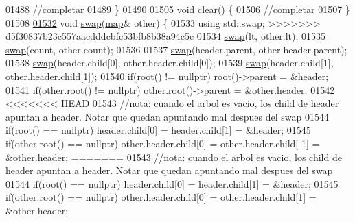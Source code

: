 \begin{DoxyCode}
01488         \textcolor{comment}{//completar}
01489     \}
01490 
\hyperlink{namespaceaed2_ac055546b287d4b50772e8b4e9d188ed2_ac055546b287d4b50772e8b4e9d188ed2}{01505}     \textcolor{keywordtype}{void} \hyperlink{namespaceaed2_ac055546b287d4b50772e8b4e9d188ed2_ac055546b287d4b50772e8b4e9d188ed2}{clear}() \{
01506         \textcolor{comment}{//completar}
01507     \}
01508 
\hyperlink{namespaceaed2_ab24ac4be44835194ce27a61969e4a292_ab24ac4be44835194ce27a61969e4a292}{01532}     \textcolor{keywordtype}{void} \hyperlink{namespaceaed2_ab24ac4be44835194ce27a61969e4a292_ab24ac4be44835194ce27a61969e4a292}{swap}(\hyperlink{classaed2_1_1map}{map}& other) \{
01533         \textcolor{keyword}{using} std::swap;
>>>>>>> d5f30837b23c557aacdddcbfc53bfb8b38a94c5c
01534         \hyperlink{namespaceaed2_ab24ac4be44835194ce27a61969e4a292_ab24ac4be44835194ce27a61969e4a292}{swap}(lt, other.lt);
01535         \hyperlink{namespaceaed2_ab24ac4be44835194ce27a61969e4a292_ab24ac4be44835194ce27a61969e4a292}{swap}(count, other.count);
01536 
01537         \hyperlink{namespaceaed2_ab24ac4be44835194ce27a61969e4a292_ab24ac4be44835194ce27a61969e4a292}{swap}(header.parent, other.header.parent);
01538         \hyperlink{namespaceaed2_ab24ac4be44835194ce27a61969e4a292_ab24ac4be44835194ce27a61969e4a292}{swap}(header.child[0], other.header.child[0]);
01539         \hyperlink{namespaceaed2_ab24ac4be44835194ce27a61969e4a292_ab24ac4be44835194ce27a61969e4a292}{swap}(header.child[1], other.header.child[1]);
01540         \textcolor{keywordflow}{if}(root() != \textcolor{keyword}{nullptr}) root()->parent = &header;
01541         \textcolor{keywordflow}{if}(other.root() != \textcolor{keyword}{nullptr}) other.root()->parent = &other.header;
01542 
<<<<<<< HEAD
01543         \textcolor{comment}{//nota: cuando el arbol es vacio, los child de header apuntan a header.
        Notar que quedan apuntando mal despues del swap}
01544         \textcolor{keywordflow}{if}(root() == \textcolor{keyword}{nullptr}) header.child[0] = header.child[1] = &header;
01545         \textcolor{keywordflow}{if}(other.root() == \textcolor{keyword}{nullptr}) other.header.child[0] = other.header.child[
      1] = &other.header;
=======
01543         \textcolor{comment}{//nota: cuando el arbol es vacio, los child de header apuntan a header.  Notar que quedan apuntando
       mal despues del swap}
01544         \textcolor{keywordflow}{if}(root() == \textcolor{keyword}{nullptr}) header.child[0] = header.child[1] = &header;
01545         \textcolor{keywordflow}{if}(other.root() == \textcolor{keyword}{nullptr}) other.header.child[0] = other.header.child[1] = &other.header;

\end{DoxyCode}
